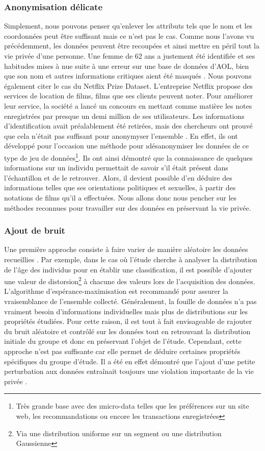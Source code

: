 \subsubsection{Anonymisation délicate}
Simplement, nous pouvons penser qu'enlever les attributs tels que le nom et les coordonnées peut être suffisant mais ce n'est pas le cas. Comme nous l'avons vu précédemment, les données peuvent être recoupées et ainsi mettre en péril tout la vie privée d'une personne. Une femme de 62 ans a justement été identifiée et ses habitudes mises à nue suite à une erreur sur une base de données d'AOL, bien que son nom et autres informations critiques aient été masqués \cite{aolProfile}.
Nous pouvons également citer le cas du Netflix Prize Dataset. L'entreprise Netflix propose des services de location de films, films que ses clients peuvent noter. Pour améliorer leur service, la société a lancé un concours en mettant comme matière les notes enregistrées par presque un demi million de ses utilisateurs. Les informations d'identification avait préalablement été retirées, mais des chercheurs ont prouvé que cela n'était pas suffisant pour anonymyser l'ensemble \cite{deanonymization}. En effet, ils ont développé pour l'occasion une méthode pour \i{désanonymiser} les données de ce type de jeu de données\footnote{Très grande base avec des \i{micro-data} telles que les préférences sur un site web, les recommandations ou encore les transactions enregistrées}. Ils ont ainsi démontré que la connaissance de quelques informations sur un individu permettait de savoir s'il était présent dans l'échantillon et de le retrouver. Alors, il devient possible d'en déduire des informations telles que ses orientations politiques et sexuelles, à partir des notations de films qu'il a effectuées.
Nous allons donc nous pencher sur les méthodes reconnues pour travailler sur des données en préservant la vie privée.

\subsubsection{Ajout de bruit}
Une première approche consiste à faire varier de manière aléatoire les données recueillies \cite{randomDM}. Par exemple, dans le cas où l'étude cherche à analyser la distribution de l'âge des individus pour en établir une classification, il est possible d'ajouter une valeur de distorsion\footnote{Via une distribution uniforme sur un segment ou une distribution Gaussienne} à chacune des valeurs lors de l'acquisition des données. L'algorithme d'espérance-maximisation \cite{AlgoEM} est recommandé pour assurer la vraisemblance de l'ensemble collecté. Généralement, la fouille de données n'a pas vraiment besoin d'informations individuelles mais plus de distributions sur les propriétés étudiées. Pour cette raison, il est tout à fait envisageable de rajouter du bruit aléatoire et contrôlé sur les données tout en retrouvant la distribution initiale du groupe et donc en préservant l'objet de l'étude.
Cependant, cette approche n'est pas suffisante car elle permet de déduire certaines propriétés spécifiques du groupe d'étude. Il a été en effet démontré que l'ajout d'une petite perturbation aux données entraînait toujours une violation importante de la vie privée \cite{crackPrivacyDB}.

